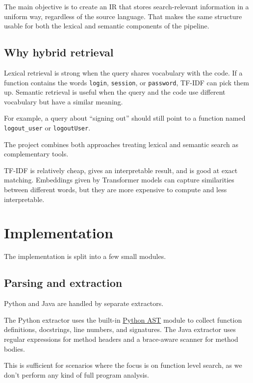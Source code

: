 \documentclass[12pt]{article}
\begin{document}
The main objective is to create an IR that stores search-relevant information in a uniform way, regardless of the source language.
That makes the same structure usable for both the lexical and semantic components of the pipeline.

\subsection{Why hybrid retrieval}
\label{subsec:hybrid}

Lexical retrieval is strong when the query shares vocabulary with the code.
If a function contains the words \texttt{login}, \texttt{session}, or \texttt{password}, TF-IDF can pick them up.
Semantic retrieval is useful when the query and the code use different vocabulary but have a similar meaning.

\noindent
For example, a query about ``signing out'' should still point to a function named \texttt{logout\_user} or \texttt{logoutUser}.

The project combines both approaches treating lexical and semantic search as complementary tools.

TF-IDF is relatively cheap, gives an interpretable result, and is good at exact matching.
Embeddings given by Transformer models can capture similarities between different words, but they are more expensive to compute and less interpretable.

\section{Implementation}
\label{sec:implementation}

The implementation is split into a few small modules.

\subsection{Parsing and extraction}
\label{subsec:parsing}

Python and Java are handled by separate extractors.

\noindent
The Python extractor uses the built-in \href{https://docs.python.org/3/library/ast.html}{Python AST} module to collect function definitions, docstrings, line numbers, and signatures.
The Java extractor uses regular expressions for method headers and a brace-aware scanner for method bodies.

\noindent
This is sufficient for scenarios where the focus is on function level search, as we don't perform any kind of full program analysis.
\end{document}
